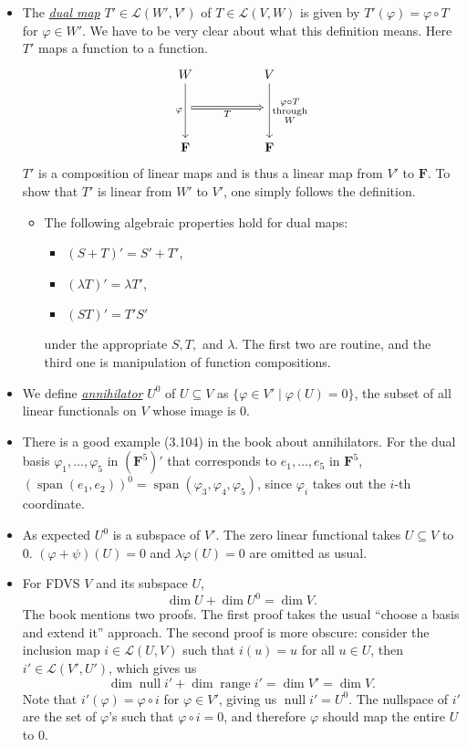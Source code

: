 \documentclass{article}
\newcommand{\df}[1]{\ul{\textit{#1}}}
\newcommand{\F}{\mathbf{F}}
\newcommand{\s}{\operatorname{span}}
\newcommand{\n}{\operatorname{null}}
\renewcommand{\r}{\operatorname{range}}
\renewcommand{\d}{\dim}
\newcommand{\LVW}{\mathcal{L}(V,W)}
\renewcommand{\phi}{\varphi}
\begin{document}
\begin{itemize}
\begin{itemize}
    \end{itemize}
    \item The \df{dual map} $T' \in \mathcal{L}(W',V')$ of $T \in \LVW$ is given by $T'(\phi)=\phi \circ T$ for $\phi \in W'$. We have to be very clear about what this definition means. Here $T'$ maps a function to a function.
    \begin{equation*}
        \begin{tikzcd}
            W \arrow[dd, "\phi"'] &  & V 
            \arrow[dd, "\substack{\phi \circ T \\ \text{through} \\ W}"] \\
            {} \arrow[rr, "T"', Rightarrow] &  & {} \\
            \F &  & \F
        \end{tikzcd}
    \end{equation*}
    $T'$ is a composition of linear maps and is thus a linear map from $V'$ to $\F$. To show that $T'$ is linear from $W'$ to $V'$, one simply follows the definition.
    \begin{itemize}
        \item The following algebraic properties hold for dual maps:
        \begin{itemize}
            \item $(S+T)'=S'+T'$,
            \item $(\lambda T)'=\lambda T'$,
            \item $(ST)'=T'S'$
        \end{itemize}
        under the appropriate $S,T,$ and $\lambda$. The first two are routine, and the third one is manipulation of function compositions.
    \end{itemize}
    \item We define \df{annihilator} $U^0$ of $U \subseteq V$ as $\{\phi \in V' \mid \phi(U)=0\}$, the subset of all linear functionals on $V$ whose image is 0.
    \item There is a good example (3.104) in the book about annihilators. For the dual basis $\phi_1,\dots,\phi_5$ in $(\F^5)'$ that corresponds to $e_1,\dots,e_5$ in $\F^5$, $(\s(e_1,e_2))^0 = \s(\phi_3,\phi_4,\phi_5)$, since $\phi_i$ takes out the $i$-th coordinate.
    \item As expected $U^0$ is a subspace of $V'$. The zero linear functional takes $U \subseteq V$ to $0$. $(\phi+\psi)(U) = 0$ and $\lambda\phi(U) = 0$ are omitted as usual.
    \item For FDVS $V$ and its subspace $U$, $$\d U + \d U^0 = \d V.$$ The book mentions two proofs. The first proof takes the usual ``choose a basis and extend it'' approach. The second proof is more obscure: consider the inclusion map $i \in \mathcal{L}(U,V)$ such that $i(u) = u$ for all $u \in U$, then $i' \in \mathcal{L}(V',U')$, which gives us $$\d \n i' + \d \r i' = \d V' = \d V.$$ Note that $i'(\phi) = \phi \circ i$ for $\phi \in V'$, giving us $\n i' = U^0$. The nullspace of $i'$ are the set of $\phi$'s such that $\phi \circ i = 0$, and therefore $\phi$ should map the entire $U$ to $0$.
    

\end{itemize}
\end{document}
